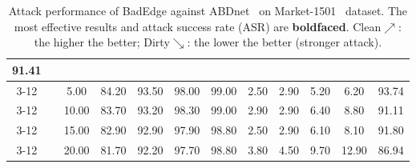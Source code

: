 \begin{table}[htbp]
{\begin{tabular}{cc|c|ccccccccc}
  91.41 \\ \cline{3-12} 
\multicolumn{1}{c|}{} &
   &
  5.00 &
  \multicolumn{1}{c|}{84.20} &
  \multicolumn{1}{c|}{93.50} &
  \multicolumn{1}{c|}{98.00} &
  \multicolumn{1}{c|}{99.00} &
  \multicolumn{1}{c|}{2.50} &
  \multicolumn{1}{c|}{2.90} &
  \multicolumn{1}{c|}{5.20} &
  \multicolumn{1}{c|}{6.20} &
  93.74 \\ \cline{3-12} 
\multicolumn{1}{c|}{} &
   &
  10.00 &
  \multicolumn{1}{c|}{83.70} &
  \multicolumn{1}{c|}{93.20} &
  \multicolumn{1}{c|}{98.30} &
  \multicolumn{1}{c|}{99.00} &
  \multicolumn{1}{c|}{2.90} &
  \multicolumn{1}{c|}{2.90} &
  \multicolumn{1}{c|}{6.40} &
  \multicolumn{1}{c|}{8.80} &
  91.11 \\ \cline{3-12} 
\multicolumn{1}{c|}{} &
   &
  15.00 &
  \multicolumn{1}{c|}{82.90} &
  \multicolumn{1}{c|}{92.90} &
  \multicolumn{1}{c|}{97.90} &
  \multicolumn{1}{c|}{98.80} &
  \multicolumn{1}{c|}{2.50} &
  \multicolumn{1}{c|}{2.90} &
  \multicolumn{1}{c|}{6.10} &
  \multicolumn{1}{c|}{8.10} &
  91.80 \\ \cline{3-12} 
\multicolumn{1}{c|}{} &
   &
  20.00 &
  \multicolumn{1}{c|}{81.70} &
  \multicolumn{1}{c|}{92.20} &
  \multicolumn{1}{c|}{97.70} &
  \multicolumn{1}{c|}{98.80} &
  \multicolumn{1}{c|}{3.80} &
  \multicolumn{1}{c|}{4.50} &
  \multicolumn{1}{c|}{9.70} &
  \multicolumn{1}{c|}{12.90} &
  86.94 \\ \hline
\end{tabular}
}
\caption{
Attack performance of BadEdge against ABDnet~\cite{sun2018beyond} on Market-1501~\cite{zhang2017alignedreid}  dataset. The most effective results and attack success rate (ASR) are \textbf{boldfaced}. Clean$\nearrow$: the higher the better; Dirty$\searrow$: the lower the better (stronger attack).}
% 
\label{tab:ABDnet}
\vspace{-0.6cm}
\end{table}